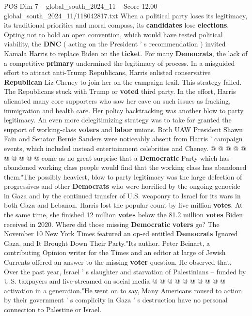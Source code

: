 \begin{textsample}{POS Dim 7 – global\_south\_2024\_11 – Score 12.00 – global\_south\_2024\_11/118042817.txt}  \label{ex:f7_pos_137}
When a political party loses its legitimacy, its traditional priorities and moral compass, its \textbf{candidates} lose \textbf{elections}.
Opting not to hold an open convention, which would have tested political viability, the \textbf{DNC} ( acting on the President ' s recommendation ) invited Kamala Harris to replace Biden on the \textbf{ticket}.
For many \textbf{Democrats}, the lack of a competitive \textbf{primary} undermined the legitimacy of process.
In a misguided effort to attract anti-Trump Republicans, Harris enlisted conservative \textbf{Republican} Liz Cheney to join her on the campaign trail.
This strategy failed.
The Republicans stuck with Trump or \textbf{voted} third party.
In the effort, Harris alienated many core supporters who saw her cave on such issues as fracking, immigration and health care.
Her policy backtracking was another blow to party legitimacy.
An even more delegitimizing strategy was to take for granted the support of working-class \textbf{voters} and \textbf{labor} unions.
Both UAW President Shawn Fain and Senator Bernie Sanders were noticeably absent from Harris ' campaign events, which included instead entertainment celebrities and Cheney. @ @ @ @ @ @ @ @ @ @ come as no great surprise that a \textbf{Democratic} Party which has abandoned working class people would find that the working class has abandoned them."The possibly heaviest, blow to party legitimacy was the large defection of progressives and other \textbf{Democrats} who were horrified by the ongoing genocide in Gaza and by the continued transfer of U.S. weaponry to Israel for its wars in both Gaza and Lebanon.
Harris lost the popular count by five million \textbf{votes}.
At the same time, she finished 12 million \textbf{votes} below the 81.2 million \textbf{votes} Biden received in 2020.
Where did those missing \textbf{Democratic} \textbf{voters} go?
The November 10 New York Times featured an op-ed entitled \textbf{Democrats} Ignored Gaza, and It Brought Down Their Party."Its author.
Peter Beinart, a contributing Opinion writer for the Times and an editor at large of Jewish Currents offered an answer to the missing \textbf{voter} question.
He observed that, Over the past year, Israel ' s slaughter and starvation of Palestinians -- funded by U.S. taxpayers and live-streamed on social media @ @ @ @ @ @ @ @ @ @ activation in a generation."He went on to say, Many Americans roused to action by their government ' s complicity in Gaza ' s destruction have no personal connection to Palestine or Israel.

\end{textsample}
